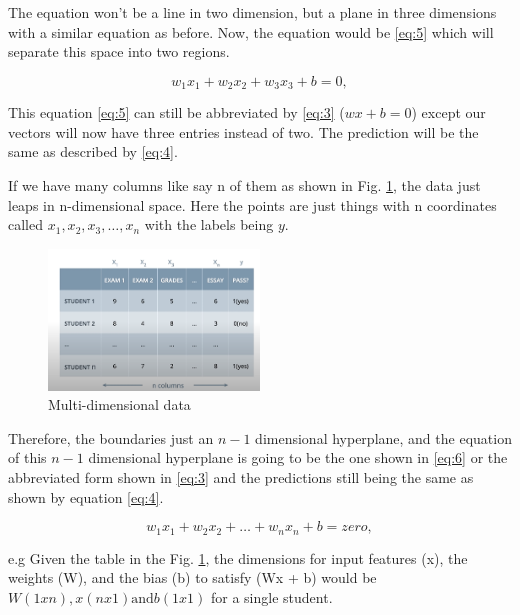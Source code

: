 \documentclass{article}
\begin{document}
The equation won't be a line in two dimension, but a plane in three dimensions with a similar equation as before. Now, the equation would be \eqref{eq:5} which will separate this space into two regions.

\begin{equation}
w_1x_1 + w_2x_2 + w_3x_3 + b = 0, \label{eq:5}
\end{equation}  

This equation \eqref{eq:5} can still be abbreviated by \eqref{eq:3} (\(wx+b=0\)) except our vectors will now have three entries instead of two. The prediction will be the same as described by \eqref{eq:4}.

If we have many columns like say n of them as shown in Fig. \ref{fig:f5}, the data just leaps in n-dimensional space. Here the points are just things with n coordinates called \(x_1, x_2, x_3, \dots, x_n  \) with the labels being \(y\).

\begin{figure}[ht]
    \centering
    \includegraphics[width=0.5\textwidth,height=0.5\textheight,keepaspectratio]{images/multiple_dimension.PNG}
    \captionsetup{justification=centering}
    \caption{Multi-dimensional data}
    \label{fig:f5}
\end{figure}

Therefore, the boundaries just an \(n-1\) dimensional hyperplane, and the equation of this \(n-1\) dimensional hyperplane is going to be the one shown in \eqref{eq:6} or the abbreviated form shown in \eqref{eq:3} and the predictions still being the same as shown by equation \eqref{eq:4}.

\begin{equation}
w_1x_1 + w_2x_2 + \dots + w_n x_n + b = zero, \label{eq:6}
\end{equation}  

e.g Given the table in the Fig. \ref{fig:f5}, the dimensions for input features (x), the weights (W), and the bias (b) to satisfy (Wx + b) would be \( W(1xn), x(nx1) \text{and} b(1x1)\) for a single student.
\end{document}
